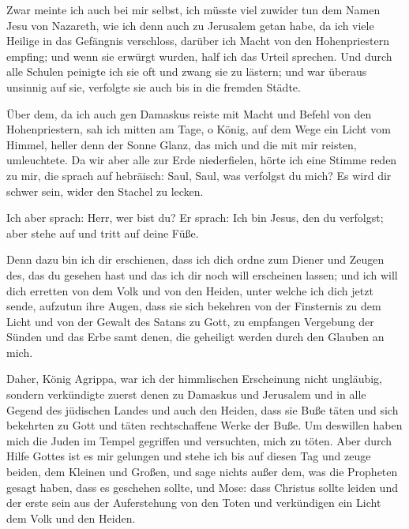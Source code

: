  Zwar meinte ich auch bei mir selbst, ich müsste viel
zuwider tun dem Namen Jesu von Nazareth,  wie ich denn
auch zu Jerusalem getan habe, da ich viele Heilige in das Gefängnis
verschloss, darüber ich Macht von den Hohenpriestern empfing; und wenn
sie erwürgt wurden, half ich das Urteil sprechen.  Und
durch alle Schulen peinigte ich sie oft und zwang sie zu lästern; und
war überaus unsinnig auf sie, verfolgte sie auch bis in die fremden
Städte.

 Über dem, da ich auch gen Damaskus reiste mit Macht und
Befehl von den Hohenpriestern,  sah ich mitten am Tage, o
König, auf dem Wege ein Licht vom Himmel, heller denn der Sonne Glanz,
das mich und die mit mir reisten, umleuchtete.  Da wir
aber alle zur Erde niederfielen, hörte ich eine Stimme reden zu mir, die
sprach auf hebräisch: Saul, Saul, was verfolgst du mich? Es wird dir
schwer sein, wider den Stachel zu lecken.

 Ich aber sprach: Herr, wer bist du? Er sprach: Ich bin
Jesus, den du verfolgst; aber stehe auf und tritt auf deine Füße.

 Denn dazu bin ich dir erschienen, dass ich dich ordne
zum Diener und Zeugen des, das du gesehen hast und das ich dir noch will
erscheinen lassen;  und ich will dich erretten von dem
Volk und von den Heiden, unter welche ich dich jetzt sende,
 aufzutun ihre Augen, dass sie sich bekehren von der
Finsternis zu dem Licht und von der Gewalt des Satans zu Gott, zu
empfangen Vergebung der Sünden und das Erbe samt denen, die geheiligt
werden durch den Glauben an mich.

 Daher, König Agrippa, war ich der himmlischen
Erscheinung nicht ungläubig,  sondern verkündigte zuerst
denen zu Damaskus und Jerusalem und in alle Gegend des jüdischen Landes
und auch den Heiden, dass sie Buße täten und sich bekehrten zu Gott und
täten rechtschaffene Werke der Buße.  Um deswillen haben
mich die Juden im Tempel gegriffen und versuchten, mich zu töten.
 Aber durch Hilfe Gottes ist es mir gelungen und stehe
ich bis auf diesen Tag und zeuge beiden, dem Kleinen und Großen, und
sage nichts außer dem, was die Propheten gesagt haben, dass es geschehen
sollte, und Mose:  dass Christus sollte leiden und der
erste sein aus der Auferstehung von den Toten und verkündigen ein Licht
dem Volk und den Heiden.

